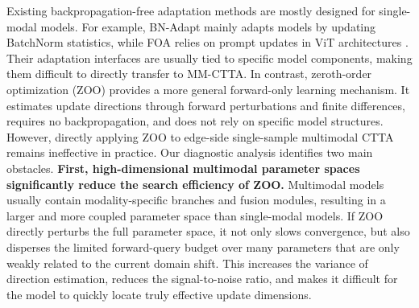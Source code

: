 Existing backpropagation-free adaptation methods are mostly designed for single-modal models.
For example, BN-Adapt mainly adapts models by updating BatchNorm statistics, while FOA relies on prompt updates in ViT architectures \citep{nado2020predictiontime,niu2024forwardonly}.
Their adaptation interfaces are usually tied to specific model components, making them difficult to directly transfer to MM-CTTA.
In contrast, zeroth-order optimization (ZOO) provides a more general forward-only learning mechanism.
It estimates update directions through forward perturbations and finite differences, requires no backpropagation, and does not rely on specific model structures.
However, directly applying ZOO to edge-side single-sample multimodal CTTA remains ineffective in practice.
Our diagnostic analysis identifies two main obstacles.
\textbf{First, high-dimensional multimodal parameter spaces significantly reduce the search efficiency of ZOO.}
Multimodal models usually contain modality-specific branches and fusion modules, resulting in a larger and more coupled parameter space than single-modal models.
If ZOO directly perturbs the full parameter space, it not only slows convergence, but also disperses the limited forward-query budget over many parameters that are only weakly related to the current domain shift.
This increases the variance of direction estimation, reduces the signal-to-noise ratio, and makes it difficult for the model to quickly locate truly effective update dimensions.
